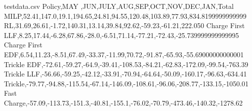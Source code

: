 
\begin{filecontents}{testdata.csv}
Policy,MAY ,JUN,JULY,AUG,SEP,OCT,NOV,DEC,JAN,Total
MILP,52.41,147.0,19.1,194.65,24.81,94.55,120.48,103.89,77.93,834.8199999999999
RL,31.69,26.61,-1.72,140.31,13.14,39.84,92.62,-59.23,-61.21,222.050
Charge First LLF,8.25,17.44,-6.28,67.86,-28.0,-6.51,71.14,-77.21,-72.43,-25.739999999999995
Charge First EDF,6.54,11.23,-8.51,67.49,-33.37,-11.99,70.72,-91.87,-65.93,-55.69000000000001
Trickle EDF,-72.61,-59.27,-64.9,-39.41,-108.53,-84.21,-62.83,-172.09,-99.54,-763.39
Trickle LLF,-56.66,-59.25,-42.12,-33.91,-70.94,-64.64,-50.09,-160.17,-96.63,-634.41
Trickle,-79.77,-94.88,-115.54,-67.14,-146.09,-108.61,-96.06,-208.77,-133.15,-1050.01
Fast Charge,-57.09,-113.73,-151.3,-40.81,-155.1,-76.02,-70.79,-473.46,-140.32,-1278.62
\end{filecontents} 


